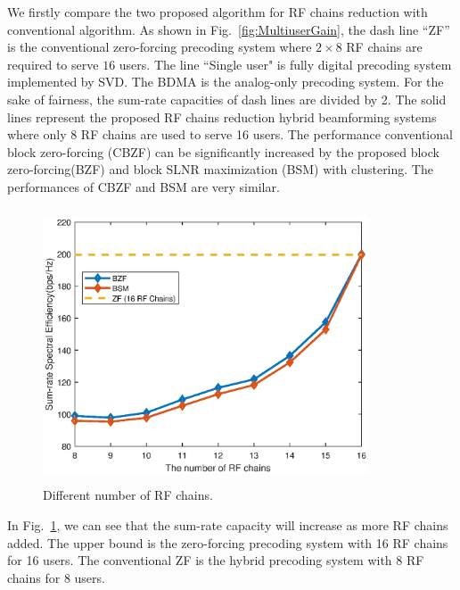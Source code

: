 \documentclass[conference]{IEEEtran}
\begin{document}
We firstly compare the two proposed algorithm for RF chains reduction with conventional algorithm. As shown in Fig.~\ref{fig:MultiuserGain}, the dash line ``ZF'' is the conventional zero-forcing precoding system where $2\times 8$ RF chains are required to serve $16$ users. The line ``Single user" is fully digital precoding system implemented by SVD. The BDMA is the analog-only precoding system. For the sake of fairness, the sum-rate capacities of dash lines are divided by 2. The solid lines represent the proposed RF chains reduction hybrid beamforming systems where only 8 RF chains are used to serve 16 users. The performance conventional block zero-forcing (CBZF) can be significantly increased by the proposed block zero-forcing(BZF) and block SLNR maximization (BSM) with clustering. The performances of CBZF and BSM are very similar. 


\begin{figure}[ht]
	\begin{center}
		\includegraphics[width=3.8in,height=3.2in]{Figure/NRFChains.eps}
		\caption{Different number of RF chains.}\label{fig:RFchains}
	\end{center}
\end{figure}
In Fig.~\ref{fig:RFchains}, we can see that the sum-rate capacity will increase as more RF chains added. The upper bound is the zero-forcing precoding system with 16 RF chains for 16 users. The conventional ZF is the hybrid precoding system with 8 RF chains for 8 users.
\end{document}
